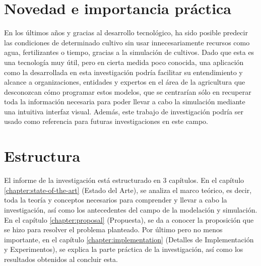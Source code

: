 \section*{Novedad e importancia práctica}
En los últimos años y gracias al desarrollo tecnológico, ha sido posible predecir las condiciones de determinado cultivo sin usar innecesariamente recursos como agua, fertilizantes o tiempo, gracias a la simulación de cultivos. Dado que esta es una tecnología muy útil, pero en cierta medida poco conocida, una aplicación como la desarrollada en esta investigación podría facilitar su entendimiento y alcance a organizaciones, entidades y expertos en el área de la agricultura que desconozcan cómo programar estos modelos, que se centrarían sólo en recuperar toda la información necesaria para poder llevar a cabo la simulación mediante una intuitiva interfaz visual. Además, este trabajo de investigación podría ser usado como referencia para futuras investigaciones en este campo.

\section*{Estructura}
El informe de la investigación está estructurado en 3 capítulos. En el capítulo \ref{chapter:state-of-the-art} (Estado del Arte), se analiza el marco teórico, es decir, toda la teoría y conceptos necesarios para comprender y llevar a cabo la investigación, así como los antecedentes del campo de la modelación y simulación. En el capítulo \ref{chapter:proposal} (Propuesta), se da a conocer la proposición que se hizo para resolver el problema planteado. Por último pero no menos importante, en el capítulo \ref{chapter:implementation} (Detalles de Implementación y Experimentos), se explica la parte práctica de la investigación, así como los resultados obtenidos al concluir esta.